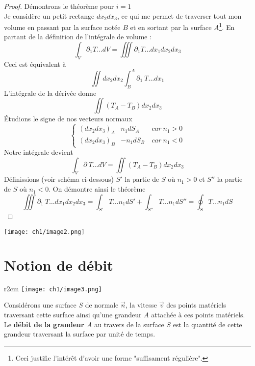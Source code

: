     \begin{proof}
    Démontrons le théorème pour $i=1$\\
    Je considère un petit rectange $dx_2dx_3$, ce qui me permet de traverser tout mon volume en passant
    par la surface notée $B$ et en sortant par la surface $A$\footnote{Ceci justifie l'intérêt d'avoir
    une forme "suffisament régulière".}. En partant de la définition de l'intégrale de volume :
    \begin{equation}
    \int_V \partial_1 T\dots dV = \iiint \partial_1 T\dots dx_1dx_2dx_3
    \end{equation}
    Ceci est équivalent à
    \begin{equation}
    \iint dx_2dx_2\int_B^A \partial_1\ T\dots dx_1
    \end{equation}
    L'intégrale de la dérivée donne
    \begin{equation}
    \iint (T_A-T_B)dx_2dx_3
    \end{equation}
    Étudions le signe de nos vecteurs normaux
    \begin{equation}
    \left\{\begin{array}{lll}
     (dx_2dx_3)_A & n_1dS_A &\ car\ n_1>0  \\
     (dx_2dx_3)_B & -n_1dS_B &\ car\ n_1<0 
    \end{array}\right.
    \end{equation}
    Notre intégrale devient
    \begin{equation}
    \int_V \partial\ T\dots dV = \iint (T_A-T_B)dx_2dx_3
    \end{equation}
    Définissions (voir schéma ci-dessous) $S'$ la partie de $S$ où $n_1>0$ et $S''$ la partie de $S$ où
    $n_1<0$. On démontre ainsi le théorème
    \begin{equation}
    \iiint \partial_1\ T\dots dx_1dx_2dx_3 = \int_{S'} T\dots n_1 dS' + \int_{S''} T\dots n_1 dS'' =
    \oint_S T\dots n_1 dS
    \end{equation}
    
    \end{proof}
    \begin{center}
    \texttt{[image: ch1/image2.png]}
    \end{center}
    
\section{Notion de débit}
\begin{wrapfigure}[12]{r}{2cm}
\texttt{[image: ch1/image3.png]}
\end{wrapfigure}
Considérons une surface $S$ de normale $\vec n$, la vitesse $\vec{v}$ des points matériels traversant cette
surface ainsi qu'une grandeur $A$ attachée à ces points matériels.\\
Le \textbf{débit de la grandeur $A$} au travers de la surface $S$ est la quantité de cette grandeur 
traversant la surface par unité de temps.\\


